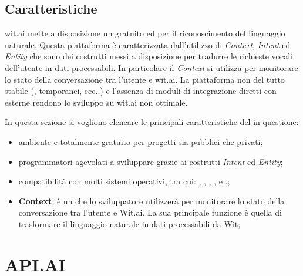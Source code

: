 \documentclass[a4paper,titlepage]{article}
\begin{document}
		\subsection{Caratteristiche}

			wit.ai mette a disposizione un  gratuito ed  per il riconoscimento del linguaggio naturale. Questa piattaforma è caratterizzata dall'utilizzo di \textit{Context}, \textit{Intent} ed \textit{Entity} che sono dei costrutti messi a disposizione per tradurre le richieste vocali dell'utente in dati processabili. In particolare il \textit{Context} si utilizza per monitorare lo stato della conversazione tra l'utente e wit.ai.
			La piattaforma non del tutto stabile (,  temporanei, ecc..) e l'assenza di moduli di integrazione diretti con  esterne rendono lo sviluppo su wit.ai non ottimale.

In questa sezione si vogliono elencare le principali caratteristiche del  in questione:
\begin{itemize}
	\item ambiente  e totalmente gratuito per progetti sia pubblici che privati;
	\item programmatori agevolati a sviluppare grazie ai costrutti \textit{Intent} ed \textit{Entity}; 
	\item compatibilità con molti sistemi operativi, tra cui: , , , ,  e .;
	\item \textbf{Context}: è un  che lo sviluppatore utilizzerà per monitorare lo stato della conversazione tra l'utente e Wit.ai. La sua principale funzione è quella di trasformare il linguaggio naturale in dati processabili da Wit;	
\end{itemize}
		
\newpage
\section{API.AI}
\end{document}
